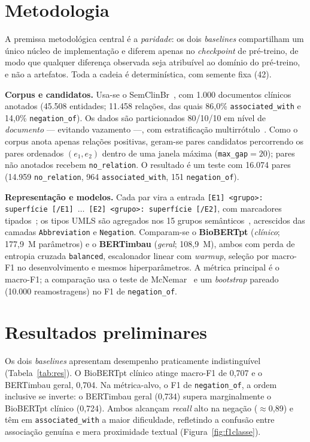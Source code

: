 \documentclass[12pt]{article}
\begin{document}
\section{Metodologia}

A premissa metodológica central é a \emph{paridade}: os dois \emph{baselines}
compartilham um único núcleo de implementação e diferem apenas no \emph{checkpoint}
de pré-treino, de modo que qualquer diferença observada seja atribuível ao
domínio do pré-treino, e não a artefatos. Toda a cadeia é determinística, com
semente fixa (42).

\noindent\textbf{Corpus e candidatos.} Usa-se o SemClinBr~\cite{oliveira:22}, com
1.000 documentos clínicos anotados (45.508 entidades; 11.458 relações, das quais
86,0\% \texttt{associated\_with} e 14,0\% \texttt{negation\_of}). Os dados são
particionados 80/10/10 em nível de \emph{documento} --- evitando vazamento ---,
com estratificação multirrótulo~\cite{sechidis:11}. Como o corpus anota apenas
relações positivas, geram-se pares candidatos percorrendo os pares ordenados
$(e_1,e_2)$ dentro de uma janela máxima (\texttt{max\_gap}$=20$); pares não
anotados recebem \texttt{no\_relation}. O resultado é um teste com 16.074 pares
(14.959 \texttt{no\_relation}, 964 \texttt{associated\_with}, 151
\texttt{negation\_of}).

\noindent\textbf{Representação e modelos.} Cada par vira a entrada
\texttt{[E1] <grupo>:\,superfície [/E1] $\ldots$ [E2] <grupo>:\,superfície [/E2]},
com marcadores tipados~\cite{soares:19}; os tipos UMLS são agregados nos 15 grupos
semânticos~\cite{mccray:01}, acrescidos das camadas \texttt{Abbreviation} e
\texttt{Negation}. Comparam-se o \textbf{BioBERTpt} (\emph{clínico}; 177,9~M
parâmetros) e o \textbf{BERTimbau} (\emph{geral}; 108,9~M), ambos com perda de
entropia cruzada \texttt{balanced}, escalonador linear com \emph{warmup}, seleção
por macro-F1 no desenvolvimento e mesmos hiperparâmetros. A métrica principal é o
macro-F1; a comparação usa o teste de McNemar~\cite{dietterich:98} e um
\emph{bootstrap} pareado (10.000 reamostragens) no F1 de \texttt{negation\_of}.

\section{Resultados preliminares}

Os dois \emph{baselines} apresentam desempenho praticamente indistinguível
(Tabela~\ref{tab:res}). O BioBERTpt clínico atinge macro-F1 de 0,707 e o BERTimbau
geral, 0,704. Na métrica-alvo, o F1 de \texttt{negation\_of}, a ordem inclusive se
inverte: o BERTimbau geral (0,734) supera marginalmente o BioBERTpt clínico
(0,724). Ambos alcançam \emph{recall} alto na negação ($\approx$0,89) e têm em
\texttt{associated\_with} a maior dificuldade, refletindo a confusão entre
associação genuína e mera proximidade textual (Figura~\ref{fig:f1classe}).
\end{document}
